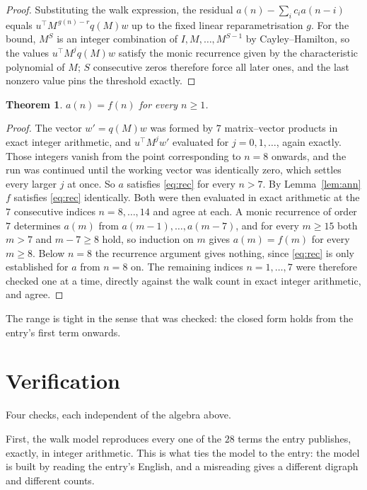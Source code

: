 \documentclass[11pt,a4paper]{article}
\theoremstyle{plain}
\newtheorem{theorem}{Theorem}
\theoremstyle{definition}
\begin{document}
\begin{proof}
Substituting the walk expression, the residual $a(n)-\sum_ic_ia(n-i)$ equals
$u^{\!\top}M^{\,g(n)-r}q(M)w$ up to the fixed linear reparametrisation $g$. For the bound,
$M^{S}$ is an integer combination of $I,M,\dots,M^{S-1}$ by Cayley--Hamilton, so the values
$u^{\!\top}M^{j}q(M)w$ satisfy the monic recurrence given by the characteristic polynomial of
$M$; $S$ consecutive zeros therefore force all later ones, and the last nonzero value pins the
threshold exactly.
\end{proof}

\begin{theorem}
$a(n)=f(n)$ for every $n\ge1$.
\end{theorem}

\begin{proof}
The vector $w'=q(M)w$ was formed by $7$ matrix--vector products in exact integer
arithmetic, and $u^{\!\top}M^{j}w'$ evaluated for $j=0,1,\dots$, again exactly. Those integers
vanish from the point corresponding to $n=8$ onwards, and the run was continued until the
working vector was identically zero, which settles every larger $j$ at once. So $a$ satisfies
\eqref{eq:rec} for every $n>7$. By Lemma~\ref{lem:ann} $f$ satisfies \eqref{eq:rec}
identically. Both were then evaluated in exact arithmetic at the $7$ consecutive indices
$n=8,\dots,14$ and agree at each. A monic recurrence of order $7$
determines $a(m)$ from $a(m-1),\dots,a(m-7)$, and for every $m\ge15$ both
$m>7$ and $m-7\ge8$ hold, so induction on $m$ gives $a(m)=f(m)$ for every
$m\ge8$.
Below $n=8$ the recurrence argument gives nothing, since \eqref{eq:rec} is only
established for $a$ from $n=8$ on. The remaining indices $n=1,\dots,7$ were
therefore checked one at a time, directly against the walk count in exact integer arithmetic,
and agree.
\end{proof}

The range is tight in the sense that was checked: the closed form holds from the entry's first term onwards.

\section{Verification}

Four checks, each independent of the algebra above.

First, the walk model reproduces every one of the $28$ terms the entry publishes,
exactly, in integer arithmetic. This is what ties the model to the entry: the model is built
by reading the entry's English, and a misreading gives a different digraph and different
counts.
\end{document}
